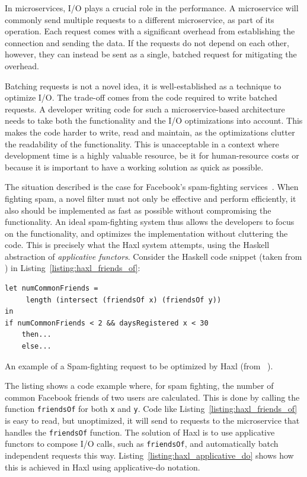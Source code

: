 In microservices, \ac{I/O} plays a crucial role in the performance.
A microservice will commonly send multiple requests to a different microservice, as part of its operation.
Each request comes with a significant overhead from establishing the connection and sending the data.
If the requests do not depend on each other, however, they can instead be sent as a single, batched request for mitigating the overhead.

Batching requests is not a novel idea, it is well-established as a technique to optimize \ac{I/O}.
The trade-off comes from the code required to write batched requests.
A developer writing code for such a microservice-based architecture needs to take both the functionality and the \ac{I/O} optimizations into account.
This makes the code harder to write, read and maintain, as the optimizations clutter the readability of the functionality.
This is unacceptable in a context where development time is a highly valuable resource, be it for human-resource costs or because it is important to have a working solution as quick as possible. 

The situation described is the case for Facebook's spam-fighting services~\cite{marlow2014haxl}.
When fighting spam, a novel filter must not only be effective and perform efficiently, it also should be implemented as fast as possible without compromising the functionality.
An ideal spam-fighting system thus allows the developers to focus on the functionality, and optimizes the implementation without cluttering the code.
This is precisely what the Haxl system attempts, using the Haskell abstraction of \emph{applicative functors}.
Consider the Haskell code snippet (taken from \cite{marlow2014haxl}) in Listing~\ref{listing:haxl_friends_of}:

\begin{listing}[h]
\begin{verbatim}
let numCommonFriends =
     length (intersect (friendsOf x) (friendsOf y))
in
if numCommonFriends < 2 && daysRegistered x < 30
    then...
    else...
\end{verbatim}
\caption{An example of a Spam-fighting request to be optimized by Haxl (from ~\cite{marlow2014haxl}).}
\label{listing:haxl_friends_of}
\end{listing}

The listing shows a code example where, for spam fighting, the number of common Facebook friends of two users are calculated.
This is done by calling the function \texttt{friendsOf} for both \texttt{x} and \texttt{y}.
Code like Listing~\ref{listing:haxl_friends_of} is easy to read, but unoptimized, it will send to requests to the microservice that handles the \texttt{friendsOf} function.
The solution of Haxl is to use applicative functors to compose \ac{I/O} calls, such as \texttt{friendsOf}, and automatically batch independent requests this way.
Listing~\ref{listing:haxl_applicative_do} shows how this is achieved in Haxl using applicative-do notation.

